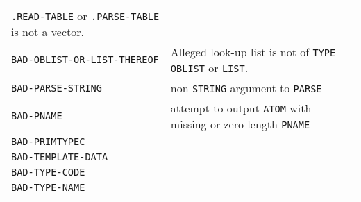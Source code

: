 \documentclass[a4paper]{scrbook}
\begin{document}
\begin{longtable}[]{@{}ll@{}}
\begin{minipage}[t]{0.36\columnwidth}
\texttt{.READ-TABLE} or \texttt{.PARSE-TABLE} is not a vector.\strut
\end{minipage}\tabularnewline
\begin{minipage}[t]{0.58\columnwidth}\raggedright\strut
\texttt{BAD-OBLIST-OR-LIST-THEREOF}\strut
\end{minipage} & \begin{minipage}[t]{0.36\columnwidth}\raggedright\strut
Alleged look-up list is not of \texttt{TYPE} \texttt{OBLIST} or \texttt{LIST}.\strut
\end{minipage}\tabularnewline
\begin{minipage}[t]{0.58\columnwidth}\raggedright\strut
\texttt{BAD-PARSE-STRING}\strut
\end{minipage} & \begin{minipage}[t]{0.36\columnwidth}\raggedright\strut
non-\texttt{STRING} argument to \texttt{PARSE}\strut
\end{minipage}\tabularnewline
\begin{minipage}[t]{0.58\columnwidth}\raggedright\strut
\texttt{BAD-PNAME}\strut
\end{minipage} & \begin{minipage}[t]{0.36\columnwidth}\raggedright\strut
attempt to output \texttt{ATOM} with missing or zero-length \texttt{PNAME}\strut
\end{minipage}\tabularnewline
\begin{minipage}[t]{0.58\columnwidth}\raggedright\strut
\texttt{BAD-PRIMTYPEC}\strut
\end{minipage} & \begin{minipage}[t]{0.36\columnwidth}\raggedright\strut
\strut
\end{minipage}\tabularnewline
\begin{minipage}[t]{0.58\columnwidth}\raggedright\strut
\texttt{BAD-TEMPLATE-DATA}\strut
\end{minipage} & \begin{minipage}[t]{0.36\columnwidth}\raggedright\strut
\strut
\end{minipage}\tabularnewline
\begin{minipage}[t]{0.58\columnwidth}\raggedright\strut
\texttt{BAD-TYPE-CODE}\strut
\end{minipage} & \begin{minipage}[t]{0.36\columnwidth}\raggedright\strut
\strut
\end{minipage}\tabularnewline
\begin{minipage}[t]{0.58\columnwidth}\raggedright\strut
\texttt{BAD-TYPE-NAME}\strut

\end{minipage}
\end{longtable}
\end{document}

